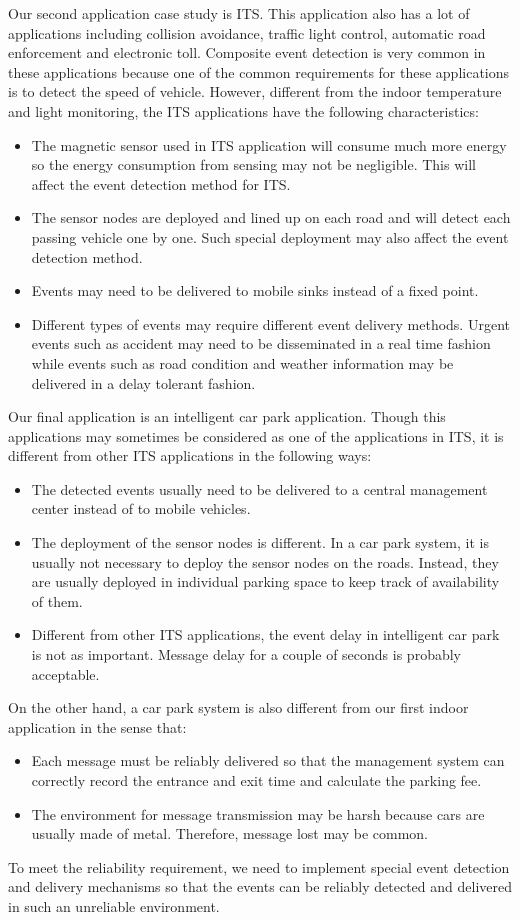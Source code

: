 Our second application case study is ITS. This application also has a lot of applications including collision avoidance, traffic light control, automatic road enforcement and electronic toll. Composite event detection is very common in these applications because one of the common requirements for these applications is to detect the speed of vehicle. However, different from the indoor temperature and light monitoring, the ITS applications have the following characteristics:
\begin{itemize}
\item The magnetic sensor used in ITS application will consume much more energy so the energy consumption from sensing may not be negligible. This will affect the event detection method for ITS.
\item The sensor nodes are deployed and lined up on each road and will detect each passing vehicle one by one. Such special deployment may also affect the event detection method.
\item Events may need to be delivered to mobile sinks instead of a fixed point.
\item Different types of events may require different event delivery methods. Urgent events such as accident may need to be disseminated in a real time fashion while events such as road condition and weather information may be delivered in a delay tolerant fashion.
\end{itemize}

Our final application is an intelligent car park application. Though this applications may sometimes be considered as one of the applications in ITS, it is different from other ITS applications in the following ways:
\begin{itemize}
\item The detected events usually need to be delivered to a central management center instead of to mobile vehicles.
\item The deployment of the sensor nodes is different. In a car park system, it is usually not necessary to deploy the sensor nodes on the roads. Instead, they are usually deployed in individual parking space to keep track of availability of them.
\item Different from other ITS applications, the event delay in intelligent car park is not as important. Message delay for a couple of seconds is probably acceptable.
\end{itemize}

On the other hand, a car park system is also different from our first indoor application in the sense that:
\begin{itemize}
\item Each message must be reliably delivered so that the management system can correctly record the entrance and exit time and calculate the parking fee.
\item The environment for message transmission may be harsh because cars are usually made of metal. Therefore, message lost may be common.
\end{itemize}
To meet the reliability requirement, we need to implement special event detection and delivery mechanisms so that the events can be reliably detected and delivered in such an unreliable environment.
